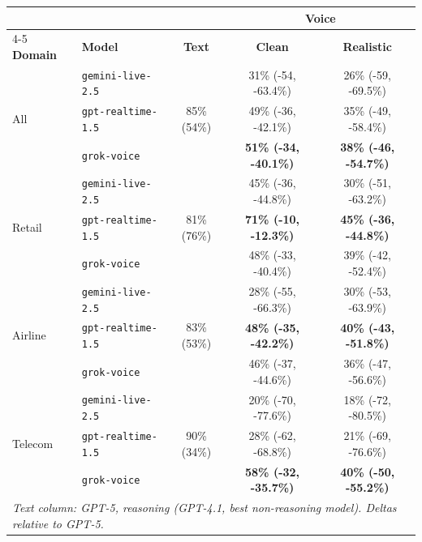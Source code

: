 \begin{tabular}{@{}llccc@{}}
\toprule
 &  &  & \multicolumn{2}{c}{\textbf{Voice}} \\
\cmidrule(l){4-5}
\textbf{Domain} & {\color{red!75!black}\textbf{Model}} & \textbf{Text} & \textbf{Clean} & \textbf{Realistic} \\
\midrule
\multirow{3}{*}{All} & {\color{red!75!black}\texttt{gemini-live-2.5}} & \multirow{3}{*}{85\% (54\%)} & 31\% (-54, -63.4\%) & 26\% (-59, -69.5\%) \\
 & {\color{red!75!black}\texttt{gpt-realtime-1.5}} &  & 49\% (-36, -42.1\%) & 35\% (-49, -58.4\%) \\
 & {\color{red!75!black}\texttt{grok-voice}} &  & \textbf{51\% (-34, -40.1\%)} & \textbf{38\% (-46, -54.7\%)} \\
\midrule
\multirow{3}{*}{Retail} & {\color{red!75!black}\texttt{gemini-live-2.5}} & \multirow{3}{*}{81\% (76\%)} & 45\% (-36, -44.8\%) & 30\% (-51, -63.2\%) \\
 & {\color{red!75!black}\texttt{gpt-realtime-1.5}} &  & \textbf{71\% (-10, -12.3\%)} & \textbf{45\% (-36, -44.8\%)} \\
 & {\color{red!75!black}\texttt{grok-voice}} &  & 48\% (-33, -40.4\%) & 39\% (-42, -52.4\%) \\
\midrule
\multirow{3}{*}{Airline} & {\color{red!75!black}\texttt{gemini-live-2.5}} & \multirow{3}{*}{83\% (53\%)} & 28\% (-55, -66.3\%) & 30\% (-53, -63.9\%) \\
 & {\color{red!75!black}\texttt{gpt-realtime-1.5}} &  & \textbf{48\% (-35, -42.2\%)} & \textbf{40\% (-43, -51.8\%)} \\
 & {\color{red!75!black}\texttt{grok-voice}} &  & 46\% (-37, -44.6\%) & 36\% (-47, -56.6\%) \\
\midrule
\multirow{3}{*}{Telecom} & {\color{red!75!black}\texttt{gemini-live-2.5}} & \multirow{3}{*}{90\% (34\%)} & 20\% (-70, -77.6\%) & 18\% (-72, -80.5\%) \\
 & {\color{red!75!black}\texttt{gpt-realtime-1.5}} &  & 28\% (-62, -68.8\%) & 21\% (-69, -76.6\%) \\
 & {\color{red!75!black}\texttt{grok-voice}} &  & \textbf{58\% (-32, -35.7\%)} & \textbf{40\% (-50, -55.2\%)} \\
\bottomrule
\multicolumn{5}{l}{\footnotesize \textit{Text column: GPT-5, reasoning (GPT-4.1, best non-reasoning model). Deltas relative to GPT-5.}} \\
\end{tabular}